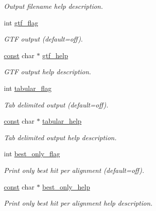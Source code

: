 \begin{DoxyCompactItemize}
\begin{DoxyCompactList}\small\item\em Output filename help description. \end{DoxyCompactList}\item 
int \hyperlink{structgengetopt__args__info_a3cc76992b00eb5f69d49ecabfa65de28}{gtf\+\_\+flag}
\begin{DoxyCompactList}\small\item\em G\+TF output (default=off). \end{DoxyCompactList}\item 
\hyperlink{getopt_8c_a2c212835823e3c54a8ab6d95c652660e}{const} char $\ast$ \hyperlink{structgengetopt__args__info_a7eb6417bded13cc26a47a1ee53bcb8dc}{gtf\+\_\+help}
\begin{DoxyCompactList}\small\item\em G\+TF output help description. \end{DoxyCompactList}\item 
int \hyperlink{structgengetopt__args__info_aa01935a1796974d3347aff6062718afc}{tabular\+\_\+flag}
\begin{DoxyCompactList}\small\item\em Tab delimited output (default=off). \end{DoxyCompactList}\item 
\hyperlink{getopt_8c_a2c212835823e3c54a8ab6d95c652660e}{const} char $\ast$ \hyperlink{structgengetopt__args__info_a923b9288287e40df1b3f21bfe288f123}{tabular\+\_\+help}
\begin{DoxyCompactList}\small\item\em Tab delimited output help description. \end{DoxyCompactList}\item 
int \hyperlink{structgengetopt__args__info_ab0275ce8469b8fa0415ec84a692aba90}{best\+\_\+only\+\_\+flag}
\begin{DoxyCompactList}\small\item\em Print only best hit per alignment (default=off). \end{DoxyCompactList}\item 
\hyperlink{getopt_8c_a2c212835823e3c54a8ab6d95c652660e}{const} char $\ast$ \hyperlink{structgengetopt__args__info_a4f31622f59d764e13fe3ef9d3d0cc579}{best\+\_\+only\+\_\+help}
\begin{DoxyCompactList}\small\item\em Print only best hit per alignment help description. \end{DoxyCompactList}\item 

\end{DoxyCompactItemize}
